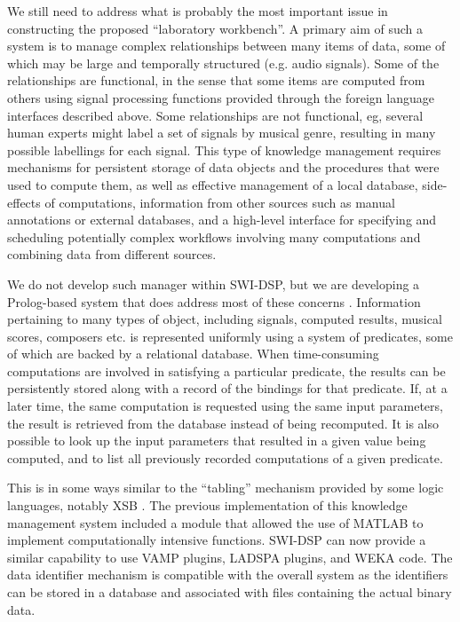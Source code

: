 \documentclass[runningheads]{llncs}
\begin{document}
We still need to address what is probably the most important issue in constructing the proposed ``laboratory workbench''. A primary aim of such a system is to manage complex relationships between many items of data, some of which may be large and temporally structured (e.g. audio signals). Some of the relationships are functional, in the sense that some items are computed from others using signal processing functions provided through the foreign language interfaces described above. Some relationships are not functional, eg, several human experts might label a set of signals by musical genre, resulting in many possible labellings for each signal. This type of knowledge management requires mechanisms for persistent storage of data objects and the procedures that were used to compute them, as well as effective management of a local database, side-effects of computations, information from other sources such as manual annotations or external databases, and a high-level interface for specifying and scheduling potentially complex workflows involving many computations and combining data from different sources.

We do not develop such manager within SWI-DSP, but we are developing a Prolog-based system that does address most of these concerns \cite{aes2006}. Information pertaining to many types of object, including signals, computed results, musical scores, composers etc. is represented uniformly using a system of predicates, some of which are backed by a relational database. When time-consuming computations are involved in satisfying a particular predicate, the results can be persistently stored along with a record of the bindings for that predicate. If, at a later time, the same computation is requested using the same input parameters, the result is retrieved from the database instead of being recomputed. It is also possible to look up the input parameters that resulted in a given value being computed, and 
to list all previously recorded computations of a given predicate.

This is in some ways similar to the ``tabling'' mechanism provided by some logic languages, notably XSB \cite{xsb}.
The previous implementation of this knowledge management system included a module that allowed the use of MATLAB to implement computationally intensive functions. SWI-DSP can now provide a similar capability to use VAMP plugins, LADSPA plugins, and WEKA code. The data identifier mechanism is compatible with the overall system as the identifiers can be stored in a database and associated with files containing the actual binary data.
\end{document}
